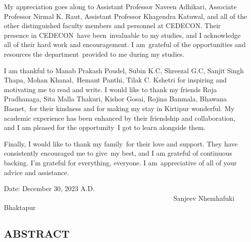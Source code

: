 \documentclass[12pt]{report}
\begin{document}
My appreciation goes along to Assistant Professor Naveen Adhikari, Associate Professor Nirmal K. Raut, Assistant Professor Khagendra Katuwal, and all of the other distinguished faculty members and personnel at CEDECON. Their  presence in CEDECON have been invaluable to my studies, and I acknowledge all of their hard work and encouragement. I am grateful of the opportunities and resources the department provided to me during my studies. 

I am thankful to Manab Prakash Poudel, Subin K.C, Shreezal G.C, Sanjit Singh Thapa, Mohan Khanal, Hemant Panthi, Tilak C. Kshetri for inspiring and motivating me to read and write. I would like to thank my friends Roja Pradhanaga, Sita Malla Thakuri, Kishor Gosai, Rojina Banmala, Bhawana Basnet, for their kindness and for making my stay in Kirtipur wonderful. My academic experience has been enhanced by their friendship and collaboration, and I am pleased for the opportunity I got to learn alongside them.

Finally, I would like to thank my family for their love and support. They have consistently encouraged me to give my best, and I am grateful of continuous backing. I'm grateful for everything, everyone. I am appreciative of all of your advice and assistance.

\vspace{1cm}

\begin{flushright}

 Date: December 30, 2023 A.D. \ \ \ \ \ \ \ \ \ \ \ \ \ \ \ \ \ \ \ \ \ \ \ \ \ \ \ \  \ \ \ \ \ \ \ \ \ \ \ \ \ \ \ \ \ \ \ \ \ \ Sanjeev Nhemhafuki\\
    Bhaktapur

\end{flushright}

\newpage %
\begin{center}
\section*{ABSTRACT}
\end{center}
\renewcommand{\thepage}{\roman{page}}
\setcounter{page}{5}


\vspace{2cm}

\begin{flushright}


\end{flushright}
\end{document}
